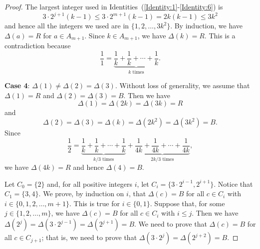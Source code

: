\documentclass[11pt]{article}
\theoremstyle{definition}
\begin{document}
\begin{proof}
The largest integer used in Identities~(\ref{Identity:1}-\ref{Identity:6}) is
\[
3\cdot2^{j+1}(k-1)\leq 3\cdot2^{m+1}(k-1)=2k(k-1)\leq 3k^2
\]
and hence all the integers we used are in $\{1,2,\ldots,3k^2\}$. By induction, we have $\Delta(a)=R$ for $a\in A_{m+1}$. Since $k\in A_{m+1}$, we have $\Delta(k)=R$. This is a contradiction because
\[
\frac{1}{1}=\underbrace{\frac{1}{k}+\frac{1}{k}+\cdots+\frac{1}{k}}_{k\text{ times}}.
\]

\textbf{Case 4}: $\Delta(1)\neq\Delta(2)=\Delta(3)$. Without loss of generality, we assume that $\Delta(1)=R$ and $\Delta(2)=\Delta(3)=B$. Then we have
\[
\Delta(1)=\Delta(2k)=\Delta(3k)=R
\]
and
\[
\Delta(2)=\Delta(3)=\Delta(k)=\Delta(2k^2)=\Delta(3k^2)=B.
\]
Since
\[
\frac{1}{2}=\underbrace{\frac{1}{k}+\frac{1}{k}+\cdots+\frac{1}{k}}_{k/3\text{ times}}+\underbrace{\frac{1}{4k}+\frac{1}{4k}+\cdots+\frac{1}{4k}}_{2k/3\text{ times}},
\]
we have $\Delta(4k)=R$ and hence $\Delta(4)=B$.

Let $C_0=\{2\}$ and, for all positive integers $i$, let $C_i=\{3\cdot2^{i-1},2^{i+1}\}$. Notice that $C_1=\{3,4\}$. We prove, by induction on $i$, that $\Delta(c)=B$ for all $c\in C_i$ with $i\in\{0,1,2,\ldots,m+1\}$. This is true for $i\in\{0,1\}$. Suppose that, for some $j\in\{1,2,\ldots,m\}$, we have $\Delta(c)=B$ for all $c\in C_i$ with $i\leq j$. Then we have $\Delta(2^j)=\Delta(3\cdot2^{j-1})=\Delta(2^{j+1})=B$. We need to prove that $\Delta(c)=B$ for all $c\in C_{j+1}$; that is, we need to prove that $\Delta(3\cdot2^{j})=\Delta(2^{j+2})=B$. 


\end{proof}
\end{document}
